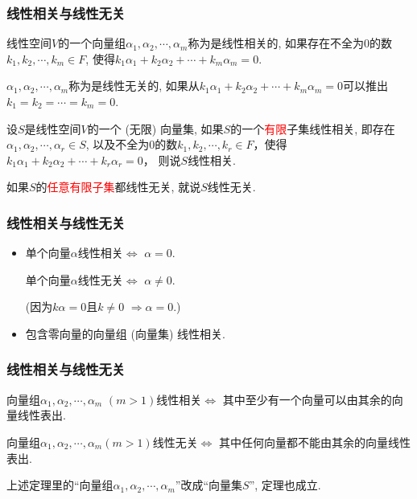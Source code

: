 \documentclass[CJK]{beamer}
\begin{document}
\begin{frame}
	\frametitle{线性相关与线性无关} \pause
	\begin{definition}
		线性空间$V$的一个向量组$\alpha_{1}, \alpha_{2}, \cdots, \alpha_{m}$称为是线性相关的, 如果存在不全为$0$的数$k_{1}, k_{2}, \cdots, k_{m}\in F$, 使得$
		k_{1}\alpha_{1}+k_{2}\alpha_{2}+\cdots+k_{m}\alpha_{m}=0$. \pause
		
		$\alpha_{1}, \alpha_{2}, \cdots, \alpha_{m}$称为是线性无关的, 如果从$k_{1}\alpha_{1}+k_{2}\alpha_{2}+\cdots+k_{m}\alpha_{m}=0$可以推出$k_{1}=k_{2}=\cdots=k_{m}=0$. \pause
	\end{definition}
	
	\begin{definition}
		设$S$是线性空间$V$的一个 (无限) 向量集, 如果$S$的一个\textcolor{red}{有限}子集线性相关, 即存在$\alpha_{1}, \alpha_{2}, \cdots, \alpha_{r}\in S$, 以及不全为$0$的数$k_{1}, k_{2}, \cdots, k_{r}\in F$，使得$
		k_{1}\alpha_{1}+k_{2}\alpha_{2}+\cdots+k_{r}\alpha_{r}=0$，
		则说$S$线性相关. \pause
		
		如果$S$的\textcolor{red}{任意有限子集}都线性无关, 就说$S$线性无关.
	\end{definition}
\end{frame}

\begin{frame}
	\frametitle{线性相关与线性无关} \pause
	\begin{itemize}
		\item 单个向量$\alpha$线性相关$\Longleftrightarrow$ $\alpha=0$.
		
		单个向量$\alpha$线性无关$\Longleftrightarrow$ $\alpha\neq 0$.
		
		(因为$k\alpha=0$且$k\neq0$ $\Longrightarrow\alpha=0$.) \pause
		
		\item 包含零向量的向量组 (向量集) 线性相关.
		
	\end{itemize}
\end{frame}

\begin{frame}
	\frametitle{线性相关与线性无关} \pause
	\begin{theorem}
		向量组$\alpha_{1}, \alpha_{2}, \cdots, \alpha_{m}$ $(m>1)$线性相关$\Longleftrightarrow$ 其中至少有一个向量可以由其余的向量线性表出. \pause
		
		向量组$\alpha_{1}, \alpha_{2}, \cdots, \alpha_{m}$$(m>1)$线性无关$\Longleftrightarrow$ 其中任何向量都不能由其余的向量线性表出.
		\end{theorem} \pause
		
		\vspace{2ex}
		
		上述定理里的``向量组$\alpha_{1}, \alpha_{2}, \cdots, \alpha_{m}$''改成``向量集$S$'', 定理也成立.
		
\end{frame}
\end{document}
